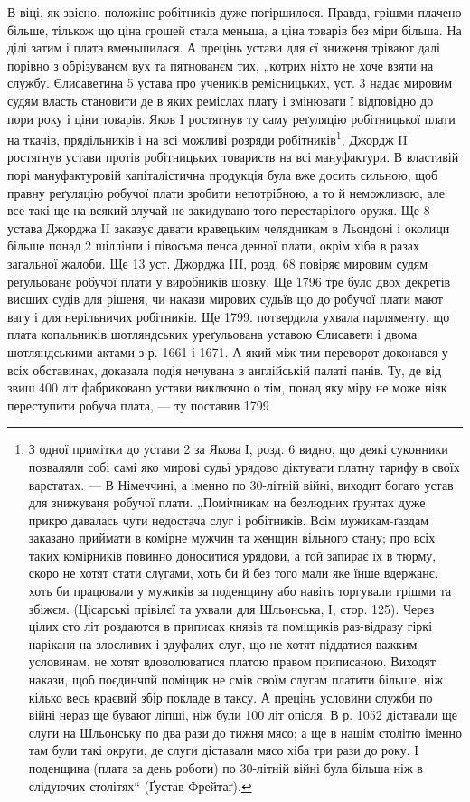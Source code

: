В  віці, як звісно, положінє робітників дуже погіршилося.
Правда, грішми плачено більше, тількож що ціна
грошей стала меньша, а ціна товарів без міри більша. На
ділі затим і плата вменьшилася. А прецінь устави для єї
зниженя трівают далі порівно з обрізуванєм вух та пятнованєм
тих, „котрих ніхто не хоче взяти на службу. Єлисаветина
5 устава про учеників ремісницьких, уст. 3 надає
мировим судям власть становити де в яких реміслах плату
і змінювати ї відповідно до пори року і ціни товарів. Яков
I ростягнув ту саму реґуляцію робітницької плати на ткачів,
прядільників і на всі можливі розряди робітників\footnote{
З одної примітки до устави 2 за Якова І, розд. 6 видно, що
деякі суконники позваляли собі самі яко мирові судьї урядово діктувати
платну тарифу в своїх варстатах. — В Німеччині, а іменно по 30-літній
війні, виходит богато устав для знижуваня робучої плати. „Помічникам
на безлюдних ґрунтах дуже прикро давалась чути недостача слуг і робітників.
Всім мужикам-ґаздам заказано приймати в комірне мужчин та
женщин вільного стану; про всіх таких комірників повинно доноситися
урядови, а той запирає їх в тюрму, скоро не хотят стати слугами, хоть би
й без того мали яке їнше вдержанє, хоть би працювали у  мужиків за поденщину
або навіть торгували грішми та збіжєм. (Цісарські прівілєї та
ухвали для Шльонська, І, стор. 125). Через цілих сто літ роздаются в приписах
князів та поміщиків раз-відразу гіркі наріканя на злосливих
і здуфалих слуг, що не хотят піддатися важким условинам, не хотят вдоволюватися
платою правом приписаною. Виходят накази, щоб поєдинчпй
поміщик не смів своїм слугам платити більше, ніж кілько весь краєвий
збір покладе в таксу. А прецінь условини служби по війні нераз ще
бувают ліпші, ніж були 100 літ опісля. В р. 1052 діставали ще слуги на
Шльонську по два рази до тижня мясо; а ще в нашім столітю іменно
там були такі округи, де слуги діставали мясо хіба три рази до року.
І поденщина (плата за день роботи) по 30-літній війні була більша ніж
в слідуючих столітях“ (Ґустав Фрейтаґ).
}, Джордж
II ростягнув устави протів робітницьких товариств на всі
мануфактури. В властивій порі мануфактуровій капіталістична
продукція була вже досить сильною, щоб правну
реґуляцію робучої плати зробити непотрібною, а то й неможливою,
але все такі ще на всякий злучай не закидувано
того перестарілого оружя. Ще 8 устава Джорджа II заказує
давати кравецьким челядникам в Льондоні і околици більше
понад 2 шіллінґи і півосьма пенса денної плати, окрім хіба
в разах загальної жалоби. Ще 13 уст. Джорджа III, розд.
68 повіряє мировим судям реґульованє робучої плати у виробників
шовку. Ще 1796 тре було двох декретів висших
судів для рішеня, чи накази мирових судьїв що до робучої
плати мают вагу і для нерільничих робітників. Ще 1799.
потвердила ухвала парляменту, що плата копальників шотляндських
уреґульована уставою Єлисавети і двома шотляндськими
актами з р. 1661 і 1671. А який між тим переворот
доконався у всіх обставинах, доказала подія нечувана
в англійській палаті панів. Ту, де від звиш 400 літ
фабриковано устави виключно о тім, понад яку міру не
може ніяк переступити робуча плата, — ту поставив 1799
\parbreak{}

